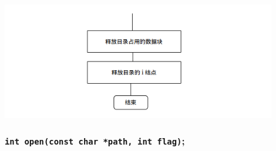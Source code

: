 \documentclass[nofonts]{ctexart}
\begin{document}
\begin{itemize}
  \includegraphics[width=12cm]{./images/./rmdir_2.png}
  \end{itemize}
  \subsubsection[\texttt{open}]{\texttt{int open(const char *path, int flag)};}
\end{document}
